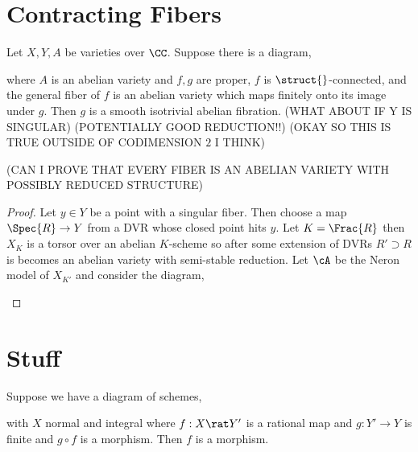 \documentclass[12pt]{article}
\begin{document}
\section{Contracting Fibers}

\begin{prop}
Let $X, Y, A$ be varieties over $\CC$. Suppose there is a diagram,
\begin{center}
\end{center}
where $A$ is an abelian variety and $f,g$ are proper, $f$ is $\struct{}$-connected, and the general fiber of $f$ is an abelian variety which maps finitely onto its image under $g$. Then $g$ is a smooth isotrivial abelian fibration. (WHAT ABOUT IF Y IS SINGULAR) (POTENTIALLY GOOD REDUCTION!!) (OKAY SO THIS IS TRUE OUTSIDE OF CODIMENSION $2$ I THINK)
\end{prop}

(CAN I PROVE THAT EVERY FIBER IS AN ABELIAN VARIETY WITH POSSIBLY REDUCED STRUCTURE)

\begin{proof}
Let $y \in Y$ be a point with a singular fiber. Then choose a map $\Spec{R} \to Y$ from a DVR whose closed point hits $y$. Let $K = \Frac{R}$ then $X_K$ is a torsor over an abelian $K$-scheme so after some extension of DVRs $R' \supset R$ is becomes an abelian variety with semi-stable reduction. Let $\cA$ be the Neron model of $X_{K'}$ and consider the diagram,
\begin{center}
\end{center}
\end{proof}

\section{Stuff}

\begin{lemma}
Suppose we have a diagram of schemes,
\begin{center}
\end{center}
with $X$ normal and integral where $f : X \rat Y'$ is a rational map and $g : Y' \to Y$ is finite and $g \circ f$ is a morphism. Then $f$ is a morphism.
\end{lemma}
\end{document}
